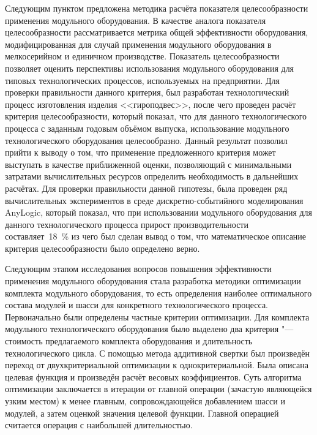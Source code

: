 Следующим пунктом предложена методика расчёта показателя целесообразности применения модульного оборудования. В качестве аналога показателя целесообразности рассматривается метрика общей эффективности оборудования, модифицированная для случай применения модульного оборудования в мелкосерийном и единичном производстве. Показатель целесообразности позволяет оценить перспективы использования модульного оборудования для типовых технологических процессов, используемых на предприятии. Для проверки правильности данного критерия, был разработан технологический процесс изготовления изделия <<гироподвес>>, после чего проведен расчёт критерия целесообразности, который показал, что для данного технологического процесса с заданным годовым объёмом выпуска, использование модульного технологического оборудования целесообразно. Данный результат позволил прийти к выводу о том, что применение предложенного критерия может выступать в качестве приближенной оценки, позволяющий с минимальными затратами вычислительных ресурсов определить необходимость в дальнейших расчётах. Для проверки правильности данной гипотезы, была проведен ряд вычислительных экспериментов в среде дискретно-событийного моделирования AnyLogic, который показал, что при использовании модульного оборудования для данного технологического процесса прирост производительности составляет~\SI{18}{\percent} из чего был сделан вывод о том, что математическое описание критерия целесообразности было определено верно.

Следующим этапом исследования вопросов повышения эффективности применения модульного оборудования стала разработка методики оптимизации комплекта модульного оборудования, то есть определения наиболее оптимального состава модулей и шасси для конкретного технологического процесса. Первоначально были определены частные критерии оптимизации. Для комплекта модульного технологического оборудования было выделено два критерия "--- стоимость предлагаемого комплекта оборудования и длительность технологического цикла. С помощью метода аддитивной свертки был произведён переход от двухкритериальной оптимизации к однокритериальной. Была описана целевая функция и произведён расчёт весовых коэффициентов. Суть алгоритма оптимизации заключается в итерации от главной операции (зачастую являющейся узким местом)  к менее главным, сопровождающейся добавлением шасси и модулей, а затем оценкой значения целевой функции. Главной операцией считается операция с наибольшей длительностью. 

\FloatBarrier